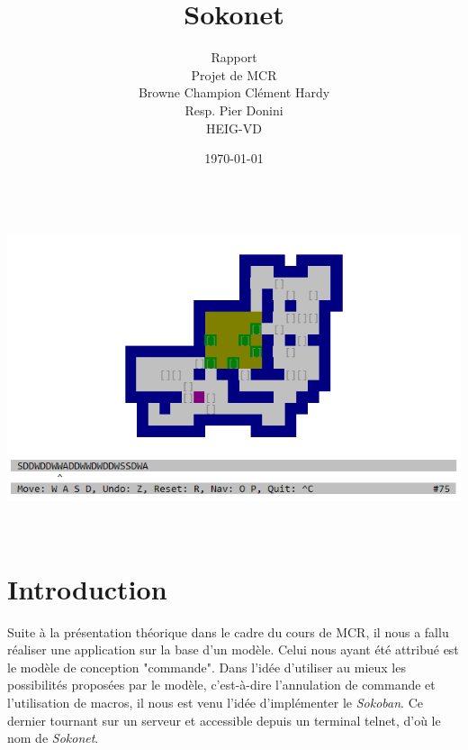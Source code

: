 \documentclass[french]{article}
\begin{document}
	
	\title{Sokonet}
	\author{Rapport\\ 
		Projet de MCR\\
		Browne Champion Clément Hardy\\
		Resp. Pier Donini\\
		HEIG-VD}
	\date{\today} %
	\maketitle
	\centering
	$ $\newline
	$ $\newline
	$ $\newline
	$ $\newline
	$ $\newline
	\includegraphics[scale=0.8]{titre}
	\thispagestyle{empty}
	
	\newpage
	\thispagestyle{empty}
	$ $
	\newpage
	
	\justify
	\normalsize
	
	
	\section{Introduction}
	Suite à la présentation théorique dans le cadre du cours de MCR, il nous a fallu réaliser une application sur la base d'un modèle. Celui nous ayant été attribué est le modèle de conception "commande". Dans l'idée d'utiliser au mieux les possibilités proposées par le modèle, c'est-à-dire l'annulation de commande et l'utilisation de macros, il nous est venu l'idée d'implémenter le \textit{Sokoban}. Ce dernier tournant sur un serveur et accessible depuis un terminal telnet, d'où le nom de \textit{Sokonet}.
		
\end{document}

